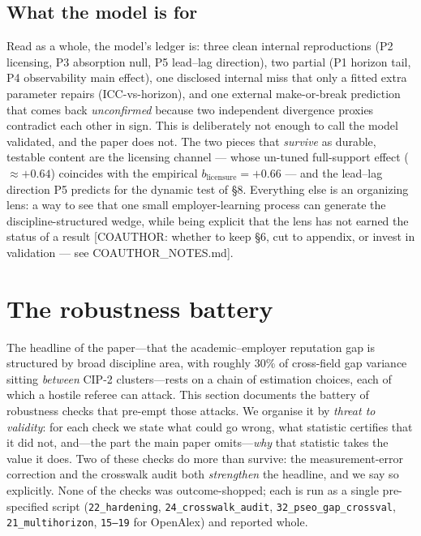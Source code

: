 \documentclass[11pt]{article}
\newcommand{\coauthor}[1]{\textcolor{blue!60!black}{[COAUTHOR: #1]}}
\begin{document}
\subsection{What the model is for}

Read as a whole, the model's ledger is: three clean internal reproductions (P2 licensing, P3 absorption null, P5 lead--lag direction), two partial (P1 horizon tail, P4 observability main effect), one disclosed internal miss that only a fitted extra parameter repairs (ICC-vs-horizon), and one external make-or-break prediction that comes back \emph{unconfirmed} because two independent divergence proxies contradict each other in sign. This is deliberately not enough to call the model validated, and the paper does not. The two pieces that \emph{survive} as durable, testable content are the licensing channel --- whose un-tuned full-support effect ($\approx+0.64$) coincides with the empirical $b_{\text{licensure}}=+0.66$ --- and the lead--lag direction P5 predicts for the dynamic test of \S8. Everything else is an organizing lens: a way to see that one small employer-learning process \citep{altonji2001employer} can generate the discipline-structured wedge, while being explicit that the lens has not earned the status of a result \coauthor{whether to keep \S6, cut to appendix, or invest in validation --- see COAUTHOR\_NOTES.md}.\section{The robustness battery}\label{sec:robust-companion}

The headline of the paper---that the academic--employer reputation gap is structured by broad discipline area, with roughly 30\% of cross-field gap variance sitting \emph{between} CIP-2 clusters---rests on a chain of estimation choices, each of which a hostile referee can attack. This section documents the battery of robustness checks that pre-empt those attacks. We organise it by \emph{threat to validity}: for each check we state what could go wrong, what statistic certifies that it did not, and---the part the main paper omits---\emph{why} that statistic takes the value it does. Two of these checks do more than survive: the measurement-error correction and the crosswalk audit both \emph{strengthen} the headline, and we say so explicitly. None of the checks was outcome-shopped; each is run as a single pre-specified script (\texttt{22\_hardening}, \texttt{24\_crosswalk\_audit}, \texttt{32\_pseo\_gap\_crossval}, \texttt{21\_multihorizon}, \texttt{15--19} for OpenAlex) and reported whole.
\end{document}
